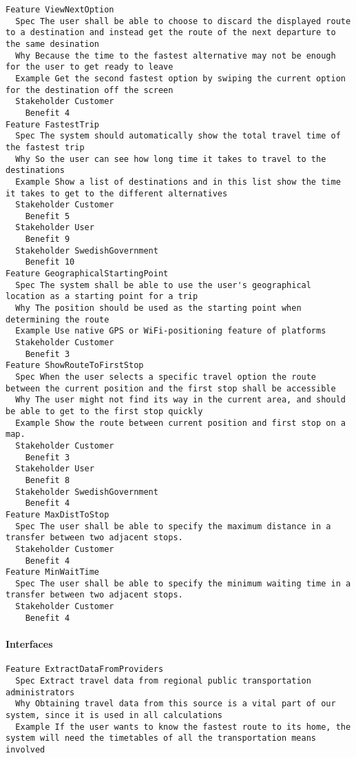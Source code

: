 \begin{lstlisting}
Feature ViewNextOption
  Spec The user shall be able to choose to discard the displayed route to a destination and instead get the route of the next departure to the same desination
  Why Because the time to the fastest alternative may not be enough for the user to get ready to leave
  Example Get the second fastest option by swiping the current option for the destination off the screen
  Stakeholder Customer
    Benefit 4
Feature FastestTrip
  Spec The system should automatically show the total travel time of the fastest trip
  Why So the user can see how long time it takes to travel to the destinations
  Example Show a list of destinations and in this list show the time it takes to get to the different alternatives
  Stakeholder Customer
    Benefit 5
  Stakeholder User
    Benefit 9
  Stakeholder SwedishGovernment
    Benefit 10
Feature GeographicalStartingPoint
  Spec The system shall be able to use the user's geographical location as a starting point for a trip
  Why The position should be used as the starting point when determining the route
  Example Use native GPS or WiFi-positioning feature of platforms
  Stakeholder Customer
    Benefit 3
Feature ShowRouteToFirstStop
  Spec When the user selects a specific travel option the route between the current position and the first stop shall be accessible
  Why The user might not find its way in the current area, and should be able to get to the first stop quickly
  Example Show the route between current position and first stop on a map.
  Stakeholder Customer
    Benefit 3
  Stakeholder User
    Benefit 8
  Stakeholder SwedishGovernment
    Benefit 4
Feature MaxDistToStop
  Spec The user shall be able to specify the maximum distance in a transfer between two adjacent stops.
  Stakeholder Customer
    Benefit 4
Feature MinWaitTime
  Spec The user shall be able to specify the minimum waiting time in a transfer between two adjacent stops.
  Stakeholder Customer
    Benefit 4

\end{lstlisting}
    
        
       \paragraph{Interfaces}


\begin{lstlisting}
Feature ExtractDataFromProviders
  Spec Extract travel data from regional public transportation administrators
  Why Obtaining travel data from this source is a vital part of our system, since it is used in all calculations
  Example If the user wants to know the fastest route to its home, the system will need the timetables of all the transportation means involved

\end{lstlisting}
    
